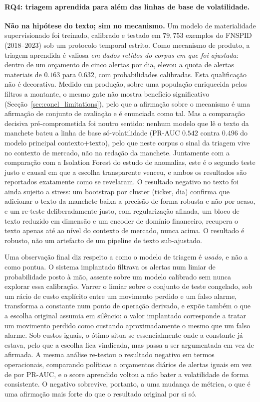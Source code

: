 \paragraph{RQ4: triagem aprendida para além das linhas de base de volatilidade.}
\textbf{Não na hipótese do texto; sim no mecanismo.} Um modelo de materialidade supervisionado foi
treinado, calibrado e testado em $79{,}753$ exemplos do FNSPID (2018--2023) sob um protocolo temporal
estrito. Como mecanismo de produto, a triagem aprendida é valiosa \emph{em dados retidos do corpus em
que foi ajustada}: dentro de um orçamento de cinco alertas por dia, elevou a quota de alertas materiais
de $0.163$ para $0.632$, com probabilidades calibradas. Esta qualificação não é decorativa. Medido em
produção, sobre uma população enriquecida pelos filtros a montante, o mesmo gate não mostra benefício
significativo (Secção~\ref{sec:concl_limitations}), pelo que a afirmação sobre o mecanismo é uma
afirmação de conjunto de avaliação e é enunciada como tal. Mas a comparação decisiva pré-comprometida
foi noutro sentido: nenhum
modelo que lê o texto da manchete bateu a linha de base só-volatilidade (PR-AUC $0.542$ contra $0.496$
do modelo principal contexto$+$texto), pelo que neste corpus o sinal da triagem vive no contexto de
mercado, não na redação da manchete. Juntamente com a comparação com a Isolation Forest do estudo de
anomalias, este é o segundo teste justo e causal em que a escolha transparente venceu, e ambos os
resultados são reportados exatamente como se revelaram. O resultado negativo no texto foi ainda
sujeito a stress: um bootstrap por cluster (ticker, dia) confirma que adicionar o texto da manchete
baixa a precisão de forma robusta e não por acaso, e um re-teste deliberadamente justo, com
regularização afinada, um bloco de texto reduzido em dimensão e um encoder de domínio financeiro,
recupera o texto apenas até ao nível do contexto de mercado, nunca acima. O resultado é robusto, não
um artefacto de um pipeline de texto sub-ajustado.

Uma observação final diz respeito a como o modelo de triagem é \emph{usado}, e não a como pontua. O
sistema implantado filtrava os alertas num limiar de probabilidade posto à mão, assente sobre um
modelo calibrado sem nunca explorar essa calibração. Varrer o limiar sobre o conjunto de teste
congelado, sob um rácio de custo explícito entre um movimento perdido e um falso alarme, transforma
a constante num ponto de operação derivado, e expõe também o que a escolha original assumia em
silêncio: o valor implantado corresponde a tratar um movimento perdido como custando
aproximadamente o mesmo que um falso alarme. Sob custos iguais, o ótimo situa-se essencialmente onde
a constante já estava, pelo que a escolha fica vindicada, mas passa a ser argumentada em vez de
afirmada. A mesma análise re-testou o resultado negativo em termos operacionais, comparando
políticas a orçamentos diários de alertas iguais em vez de por PR-AUC, e o score aprendido voltou a
não bater a volatilidade de forma consistente. O negativo sobrevive, portanto, a uma mudança de
métrica, o que é uma afirmação mais forte do que o resultado original por si só.

